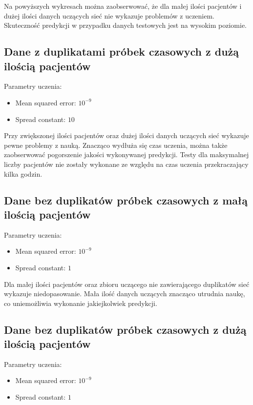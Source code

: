 \documentclass[12pt]{article}
\begin{document}
Na powyższych wykresach można zaobserwować, że dla małej ilości pacjentów i dużej ilości danych uczących sieć nie wykazuje problemów z uczeniem. Skuteczność predykcji w przypadku danych testowych jest na wysokim poziomie.

\subsection{Dane z duplikatami próbek czasowych z dużą ilością pacjentów}

Parametry uczenia:
\begin{itemize}
\item Mean squared error: $10^{-9}$
\item Spread constant: $10$
\end{itemize}

Przy zwiększonej ilości pacjentów oraz dużej ilości danych uczących sieć wykazuje pewne problemy z nauką. Znacząco wydłuża się czas uczenia, można także zaobserwować pogorszenie jakości wykonywanej predykcji. Testy dla maksymalnej liczby pacjentów nie zostały wykonane ze względu na czas uczenia przekraczający kilka godzin.

\subsection{Dane bez duplikatów próbek czasowych z małą ilością pacjentów}

Parametry uczenia:
\begin{itemize}
\item Mean squared error: $10^{-9}$
\item Spread constant: $1$
\end{itemize}

Dla małej ilości pacjentów oraz zbioru uczącego nie zawierającego duplikatów sieć wykazuje niedopasowanie. Mała ilość danych uczących znacząco utrudnia naukę, co uniemożliwia wykonanie jakiejkolwiek predykcji.

\subsection{Dane bez duplikatów próbek czasowych z dużą ilością pacjentów}

Parametry uczenia:
\begin{itemize}
\item Mean squared error: $10^{-9}$
\item Spread constant: $1$
\end{itemize}
\end{document}

